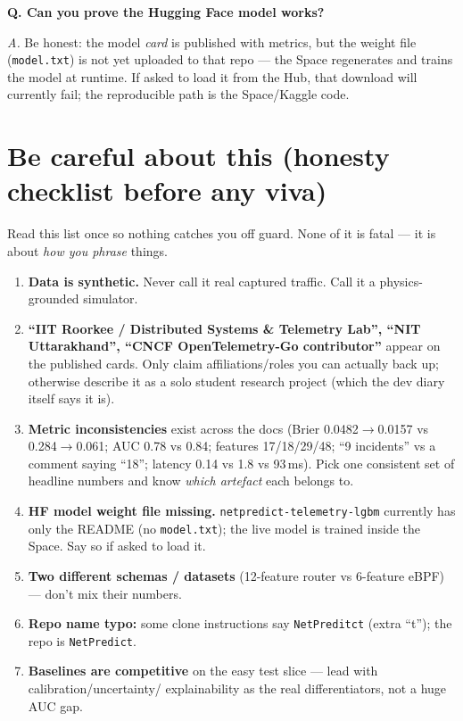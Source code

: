 \documentclass[11pt,a4paper]{article}
\newcommand{\warn}[1]{%
  \par\vspace{3pt}\noindent
  \colorbox{warnbg}{\parbox{\dimexpr\linewidth-2\fboxsep}{\small #1}}%
  \par\vspace{3pt}}
\newcommand{\Q}[1]{\vspace{4pt}\noindent\textbf{Q. #1}\par\nopagebreak}
\newcommand{\A}[1]{\noindent\textit{A.} #1\par}
\begin{document}
\Q{Can you prove the Hugging Face model works?}
\A{Be honest: the model \emph{card} is published with metrics, but the weight file (\texttt{model.txt}) is not
yet uploaded to that repo --- the Space regenerates and trains the model at runtime. If asked to load it from
the Hub, that download will currently fail; the reproducible path is the Space/Kaggle code.}

\section{Be careful about this (honesty checklist before any viva)}
\warn{Read this list once so nothing catches you off guard. None of it is fatal --- it is about
\emph{how you phrase} things.}
\begin{enumerate}
  \item \textbf{Data is synthetic.} Never call it real captured traffic. Call it a physics-grounded simulator.
  \item \textbf{``IIT Roorkee / Distributed Systems \& Telemetry Lab'', ``NIT Uttarakhand'', ``CNCF
  OpenTelemetry-Go contributor''} appear on the published cards. Only claim affiliations/roles you can actually
  back up; otherwise describe it as a solo student research project (which the dev diary itself says it is).
  \item \textbf{Metric inconsistencies} exist across the docs (Brier 0.0482$\rightarrow$0.0157 vs
  0.284$\rightarrow$0.061; AUC 0.78 vs 0.84; features 17/18/29/48; ``9 incidents'' vs a comment saying ``18'';
  latency 0.14 vs 1.8 vs 93\,ms). Pick one consistent set of headline numbers and know \emph{which artefact}
  each belongs to.
  \item \textbf{HF model weight file missing.} \texttt{netpredict-telemetry-lgbm} currently has only the README
  (no \texttt{model.txt}); the live model is trained inside the Space. Say so if asked to load it.
  \item \textbf{Two different schemas / datasets} (12-feature router vs 6-feature eBPF) --- don't mix their
  numbers.
  \item \textbf{Repo name typo:} some clone instructions say \texttt{NetPreditct} (extra ``t''); the repo is
  \texttt{NetPredict}.
  \item \textbf{Baselines are competitive} on the easy test slice --- lead with calibration/uncertainty/
  explainability as the real differentiators, not a huge AUC gap.
\end{enumerate}
\end{document}
